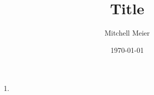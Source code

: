 \documentclass[14pt]{article}
\title{Title}
\author{Mitchell Meier}
\date{\today}
\begin{document}
\maketitle

\begin{enumerate}

\item

\end{enumerate}
\end{document}
